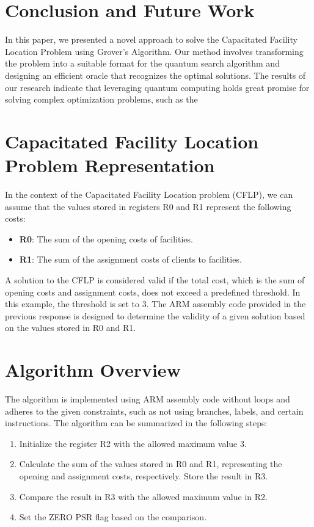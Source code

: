 \section{Conclusion and Future Work}

In this paper, we presented a novel approach to solve the Capacitated Facility Location Problem using Grover's Algorithm. Our method involves transforming the problem into a suitable format for the quantum search algorithm and designing an efficient oracle that recognizes the optimal solutions. The results of our research indicate that leveraging quantum computing holds great promise for solving complex optimization problems, such as the

\section{Capacitated Facility Location Problem Representation}

In the context of the Capacitated Facility Location problem (CFLP), we can assume that the values stored in registers R0 and R1 represent the following costs:

\begin{itemize}
    \item \textbf{R0}: The sum of the opening costs of facilities.
    \item \textbf{R1}: The sum of the assignment costs of clients to facilities.
\end{itemize}

A solution to the CFLP is considered valid if the total cost, which is the sum of opening costs and assignment costs, does not exceed a predefined threshold. In this example, the threshold is set to 3. The ARM assembly code provided in the previous response is designed to determine the validity of a given solution based on the values stored in R0 and R1.

\section{Algorithm Overview}

The algorithm is implemented using ARM assembly code without loops and adheres to the given constraints, such as not using branches, labels, and certain instructions. The algorithm can be summarized in the following steps:

\begin{enumerate}
    \item Initialize the register R2 with the allowed maximum value 3.
    \item Calculate the sum of the values stored in R0 and R1, representing the opening and assignment costs, respectively. Store the result in R3.
    \item Compare the result in R3 with the allowed maximum value in R2.
    \item Set the ZERO PSR flag based on the comparison.
\end{enumerate}

